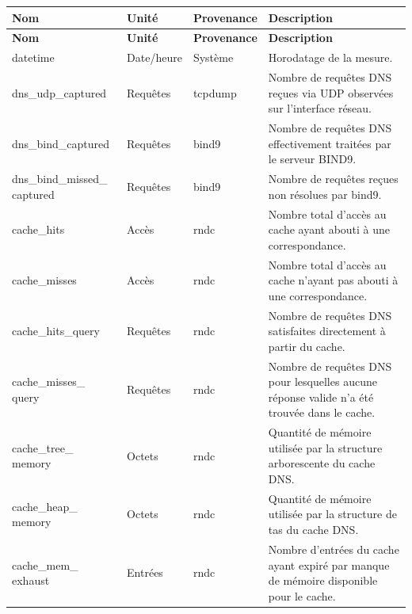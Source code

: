 \documentclass[12pt, a4paper]{report}
\begin{document}
	\begin{longtable}{|p{3.5cm}|p{2cm}|p{3cm}|p{7cm}|}
		\hline
		\textbf{Nom} & \textbf{Unité} & \textbf{Provenance} & \textbf{Description} \\
		\hline
		\endfirsthead

		\hline
		\textbf{Nom} & \textbf{Unité} & \textbf{Provenance} & \textbf{Description} \\
		\hline
		\endhead

		datetime & Date/heure & Système & Horodatage de la mesure. \\
		\hline

		dns\_udp\_captured & Requêtes & tcpdump & Nombre de requêtes DNS reçues via UDP observées sur l'interface réseau. \\
		\hline

		dns\_bind\_captured & Requêtes & \gls{bind9} & Nombre de requêtes DNS effectivement traitées par le serveur BIND9. \\
		\hline

		dns\_bind\_missed\_ captured & Requêtes & \gls{bind9} & Nombre de requêtes reçues non résolues par \gls{bind9}. \\
		\hline

		cache\_hits & Accès & rndc & Nombre total d'accès au cache ayant abouti à une correspondance. \\
    	\hline

		cache\_misses & Accès & rndc & Nombre total d'accès au cache n'ayant pas abouti à une correspondance. \\
		\hline

		cache\_hits\_query & Requêtes & rndc & Nombre de requêtes DNS satisfaites directement à partir du cache. \\
		\hline

		cache\_misses\_ query & Requêtes & rndc & Nombre de requêtes DNS pour lesquelles aucune réponse valide n'a été trouvée dans le cache. \\
		\hline

		\makecell[l]{cache\_tree\_\\memory} & Octets & rndc & Quantité de mémoire utilisée par la structure arborescente du cache DNS. \\
		\hline

		\makecell[l]{cache\_heap\_\\memory} & Octets & rndc & Quantité de mémoire utilisée par la structure de tas du cache DNS. \\
		\hline

		cache\_mem\_ exhaust & Entrées & rndc & Nombre d'entrées du cache ayant expiré par manque de mémoire disponible pour le cache. \\
		\hline


\end{longtable}
\end{document}
